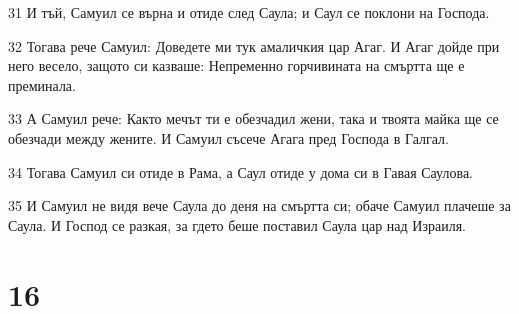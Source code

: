 \par 31 И тъй, Самуил се върна и отиде след Саула; и Саул се поклони на Господа.
\par 32 Тогава рече Самуил: Доведете ми тук амаличкия цар Агаг. И Агаг дойде при него весело, защото си казваше: Непременно горчивината на смъртта ще е преминала.
\par 33 А Самуил рече: Както мечът ти е обезчадил жени, така и твоята майка ще се обезчади между жените. И Самуил съсече Агага пред Господа в Галгал.
\par 34 Тогава Самуил си отиде в Рама, а Саул отиде у дома си в Гавая Саулова.
\par 35 И Самуил не видя вече Саула до деня на смъртта си; обаче Самуил плачеше за Саула. И Господ се разкая, за гдето беше поставил Саула цар над Израиля.

\chapter{16}

